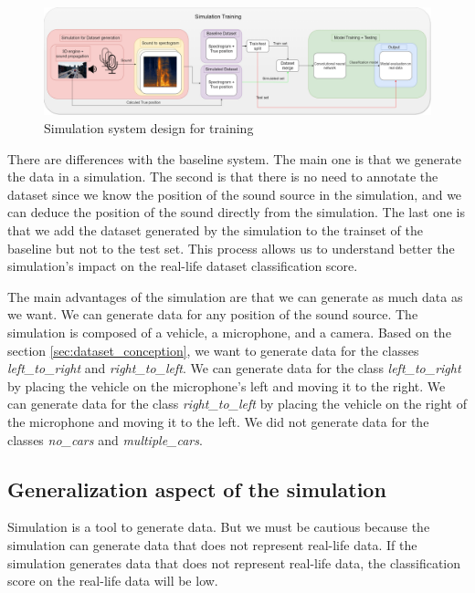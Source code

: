 \begin{figure}[H]
    \centering
    \includegraphics[width=1\textwidth]{../Images/simulation_training_design.drawio.png}
    \caption{Simulation system design for training}
    \label{fig:simulation_system_design.drawio}
\end{figure}

There are differences with the baseline system. The main one is that we generate the data in a simulation. The second is that there is no need to annotate the dataset since we know the position of the sound source in the simulation, and we can deduce the position of the sound directly from the simulation. The last one is that we add the dataset generated by the simulation to the trainset of the baseline but not to the test set. This process allows us to understand better the simulation's impact on the real-life dataset classification score.

The main advantages of the simulation are that we can generate as much data as we want. We can generate data for any position of the sound source. The simulation is composed of a vehicle, a microphone, and a camera. Based on the section \ref{sec:dataset_conception}, we want to generate data for the classes \textit{left\_to\_right} and \textit{right\_to\_left}. We can generate data for the class \textit{left\_to\_right} by placing the vehicle on the microphone's left and moving it to the right. We can generate data for the class \textit{right\_to\_left} by placing the vehicle on the right of the microphone and moving it to the left. We did not generate data for the classes \textit{no\_cars} and \textit{multiple\_cars}.

\subsection{Generalization aspect of the simulation}

Simulation is a tool to generate data. But we must be cautious because the simulation can generate data that does not represent real-life data. If the simulation generates data that does not represent real-life data, the classification score on the real-life data will be low.

